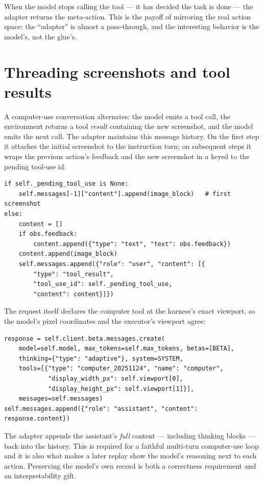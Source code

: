 \documentclass[11pt,openany]{book}
\newcommand{\code}[1]{\textcolor{clayd}{\texttt{\detokenize{#1}}}}
\begin{document}
When the model stops calling the tool — it has decided the task is done — the
adapter returns the \code{done} meta-action. This is the payoff of mirroring the
real action space: the ``adapter'' is almost a pass-through, and the interesting
behavior is the model's, not the glue's.

\section{Threading screenshots and tool results}

A computer-use conversation alternates: the model emits a tool call, the
environment returns a tool \emph{result} containing the new screenshot, and the
model emits the next call. The adapter maintains this message history. On the
first step it attaches the initial screenshot to the instruction turn; on
subsequent steps it wraps the previous action's feedback and the new screenshot
in a \code{tool_result} keyed to the pending tool-use id:

\begin{lstlisting}[style=py]
if self._pending_tool_use is None:
    self.messages[-1]["content"].append(image_block)   # first screenshot
else:
    content = []
    if obs.feedback:
        content.append({"type": "text", "text": obs.feedback})
    content.append(image_block)
    self.messages.append({"role": "user", "content": [{
        "type": "tool_result",
        "tool_use_id": self._pending_tool_use,
        "content": content}]})
\end{lstlisting}

The request itself declares the computer tool at the harness's exact viewport, so
the model's pixel coordinates and the executor's viewport agree:

\begin{lstlisting}[style=py]
response = self.client.beta.messages.create(
    model=self.model, max_tokens=self.max_tokens, betas=[BETA],
    thinking={"type": "adaptive"}, system=SYSTEM,
    tools=[{"type": "computer_20251124", "name": "computer",
            "display_width_px": self.viewport[0],
            "display_height_px": self.viewport[1]}],
    messages=self.messages)
self.messages.append({"role": "assistant", "content": response.content})
\end{lstlisting}

\begin{notebox}[.\ ]
The adapter appends the assistant's \emph{full} content — including thinking
blocks — back into the history. This is required for a faithful multi-turn
computer-use loop and it is also what makes a later replay show the model's
reasoning next to each action. Preserving the model's own record is both a
correctness requirement and an interpretability gift.
\end{notebox}
\end{document}
